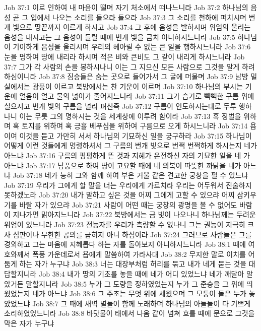 Job 37:1  이로 인하여 내 마음이 떨며 자기 처소에서 떠나느니라
Job 37:2  하나님의 음성 곧 그 입에서 나오는 소리를 들으라 들으라
Job 37:3  그 소리를 천하에 퍼치시며 번개 빛으로 땅끝까지 이르게 하시고
Job 37:4  그 후에 음성을 발하시며 위엄의 울리는 음성을 내시고는 그 음성이 들릴 때에 번개 빛을 금치 아니하시느니라
Job 37:5  하나님이 기이하게 음성을 울리시며 우리의 헤아릴 수 없는 큰 일을 행하시느니라
Job 37:6  눈을 명하여 땅에 내리라 하시며 적은 비와 큰비도 그 같이 내리게 하시느니라
Job 37:7  그가 각 사람의 손을 봉하시나니 이는 그 지으신 모든 사람으로 그것을 알게 하려 하심이니라
Job 37:8  짐승들은 숨는 곳으로 들어가서 그 굴에 머물며
Job 37:9  남방 밀실에서는 광풍이 이르고 북방에서는 찬 기운이 이르며
Job 37:10  하나님의 부시는 기운에 얼음이 얼고 물의 넓이가 줄어지느니라
Job 37:11  그가 습기로 빽빽한 구름 위에 실으시고 번개 빛의 구름을 널리 펴신즉
Job 37:12  구름이 인도하시는대로 두루 행하나니 이는 무릇 그의 명하시는 것을 세계상에 이루려 함이라
Job 37:13  혹 징벌을 위하며 혹 토지를 위하며 혹 긍휼 베푸심을 위하여 구름으로 오게 하시느니라
Job 37:14  욥이여 이것을 듣고 가만히 서서 하나님의 기묘하신 일을 궁구하라
Job 37:15  하나님이 어떻게 이런 것들에게 명령하셔서 그 구름의 번개 빛으로 번쩍 번쩍하게 하시는지 네가 아느냐
Job 37:16  구름의 평평하게 뜬 것과 지혜가 온전하신 자의 기묘한 일을 네 가 아느냐
Job 37:17  남풍으로 하여 땅이 고요할 때에 네 의복이 따뜻한 까닭을 네가 아느냐
Job 37:18  네가 능히 그와 함께 하여 부은 거울 같은 견고한 궁창을 펼 수 있느냐
Job 37:19  우리가 그에게 할 말을 너는 우리에게 가르치라 우리는 어두워서 진술하지 못하겠노라
Job 37:20  내가 말하고 싶은 것을 어찌 그에게 고할 수 있으랴 어찌 삼키우기를 바랄 자가 있으랴
Job 37:21  사람이 어떤 때는 궁창의 광명을 볼 수 없어도 바람이 지나가면 맑아지느니라
Job 37:22  북방에서는 금 빛이 나오나니 하나님께는 두려운 위엄이 있느니라
Job 37:23  전능자를 우리가 측량할 수 없나니 그는 권능이 지극히 크사 심판이나 무한한 공의를 굽히지 아니 하심이라
Job 37:24  그러므로 사람들은 그를 경외하고 그는 마음에 지혜롭다 하는 자를 돌아보지 아니하시느니라
Job 38:1  때에 여호와께서 폭풍 가운데로서 욥에게 말씀하여 가라사대
Job 38:2  무지한 말로 이치를 어둡게 하는 자가 누구냐
Job 38:3  너는 대장부처럼 허리를 묶고 내가 네게 묻는 것을 대답할지니라
Job 38:4  내가 땅의 기초를 놓을 때에 네가 어디 있었느냐 네가 깨달아 알았거든 말할지니라
Job 38:5  누가 그 도량을 정하였었는지 누가 그 준승을 그 위에 띄웠었는지 네가 아느냐
Job 38:6  그 주초는 무엇 위에 세웠으며 그 모퉁이 돌은 누가 놓았었느냐
Job 38:7  그 때에 새벽 별들이 함께 노래하며 하나님의 아들들이 다 기쁘게 소리하였었느니라
Job 38:8  바닷물이 태에서 나옴 같이 넘쳐 흐를 때에 문으로 그것을 막은 자가 누구냐
